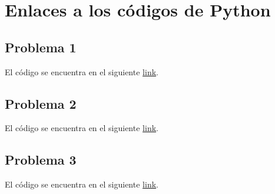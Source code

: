	\section{Enlaces a los códigos de Python}
	
	\subsection{Problema 1}
	
	El código se encuentra en el siguiente \href{URL}{link}.
	
	\subsection{Problema 2}
	
	El código se encuentra en el siguiente \href{URL}{link}.
	
	\subsection{Problema 3}
	
	El código se encuentra en el siguiente \href{URL}{link}.
	
